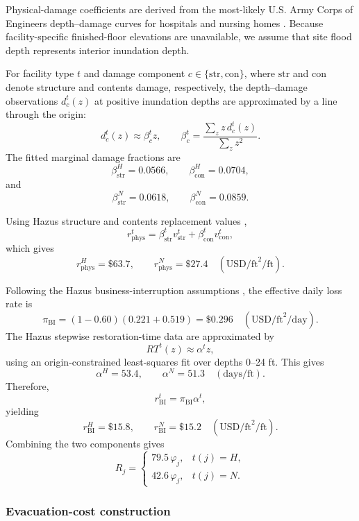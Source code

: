 \documentclass[preprint,11pt,authoryear]{elsarticle}
\begin{document}
Physical-damage coefficients are derived from the most-likely U.S. Army
Corps of Engineers depth--damage curves for hospitals and nursing homes
\citep{naccs_depth_damage}. Because facility-specific finished-floor
elevations are unavailable, we assume that site flood depth represents
interior inundation depth.

For facility type $t$ and damage component
$c\in\{\mathrm{str},\mathrm{con}\}$, where $\mathrm{str}$ and $\mathrm{con}$ denote structure and contents damage, respectively, the depth--damage observations
$d_c^t(z)$ at positive inundation depths are approximated by a line through
the origin:
\[
d_c^t(z)\approx\beta_c^t z,
\qquad
\beta_c^t
=
\frac{\sum_z z\,d_c^t(z)}
{\sum_z z^2}.
\]
The fitted marginal damage fractions are
\[
\beta_{\mathrm{str}}^H=0.0566,
\qquad
\beta_{\mathrm{con}}^H=0.0704,
\]
and
\[
\beta_{\mathrm{str}}^N=0.0618,
\qquad
\beta_{\mathrm{con}}^N=0.0859.
\]

Using Hazus structure and contents replacement values
\citep{hazus_inventory_tm},
\[
r_{\mathrm{phys}}^t
=
\beta_{\mathrm{str}}^t v_{\mathrm{str}}^t
+
\beta_{\mathrm{con}}^t v_{\mathrm{con}}^t,
\]
which gives
\[
r_{\mathrm{phys}}^H=\$63.7,
\qquad
r_{\mathrm{phys}}^N=\$27.4
\quad
(\text{USD/ft}^2/\text{ft}).
\]

Following the Hazus business-interruption assumptions
\citep{hazus_flood_tm,hazus_inventory_tm}, the effective daily loss rate is
\[
\pi_{\mathrm{BI}}
=
(1-0.60)(0.221+0.519)
=
\$0.296
\quad
(\text{USD/ft}^2/\text{day}).
\]
The Hazus stepwise restoration-time data are approximated by
\[
RT^t(z)\approx\alpha^t z,
\]
using an origin-constrained least-squares fit over depths 0--24 ft. This gives
\[
\alpha^H=53.4,
\qquad
\alpha^N=51.3
\quad
(\text{days/ft}).
\]
Therefore,
\[
r_{\mathrm{BI}}^t=\pi_{\mathrm{BI}}\alpha^t,
\]
yielding
\[
r_{\mathrm{BI}}^H=\$15.8,
\qquad
r_{\mathrm{BI}}^N=\$15.2
\quad
(\text{USD/ft}^2/\text{ft}).
\]
Combining the two components gives
\[
R_j
=
\begin{cases}
79.5\,\varphi_j, & t(j)=H,\\
42.6\,\varphi_j, & t(j)=N.
\end{cases}
\]

\subsubsection{Evacuation-cost construction}
\label{sec:supp_evacuation_cost}
\end{document}
